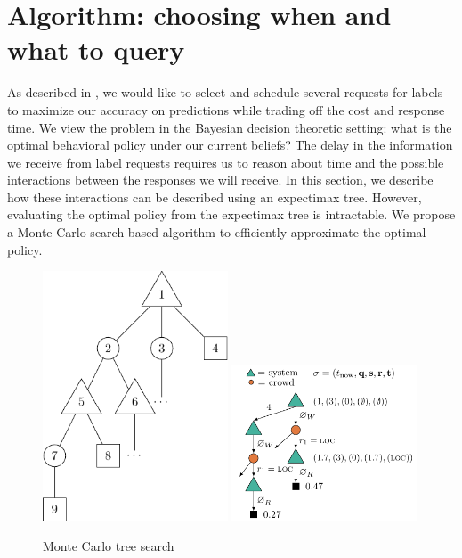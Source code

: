 \section{Algorithm: choosing when and what to query}
\label{sec:async}

As described in , we would like to select and schedule several requests for labels to maximize our accuracy on predictions while trading off the cost and response time. 
We view the problem in the Bayesian decision theoretic setting: what is the optimal behavioral policy under our current beliefs?
The delay in the information we receive from label requests requires us to reason about time and the possible interactions between the responses we will receive.
In this section, we describe how these interactions can be described using an expectimax tree.
However, evaluating the optimal policy from the expectimax tree is intractable.
We propose a Monte Carlo search based algorithm to efficiently approximate the optimal policy.


\begin{figure}
  \includegraphics[width=0.49\textwidth,height=0.23\textheight,keepaspectratio]{figures/mcts.pdf}
  \hfill
  \includegraphics[width=0.49\textwidth,height=0.23\textheight,keepaspectratio]{figures/mcts_simple.pdf}
  \caption{Monte Carlo tree search}
\label{fig:mcts}
\end{figure}

